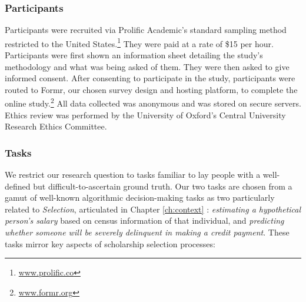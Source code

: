 \subsubsection{Participants}\label{ssec:participants}
Participants were recruited via Prolific Academic's standard sampling method restricted to the United States.\footnote{\url{www.prolific.co}} They were paid at a rate of \$15 per hour. Participants were first shown an information sheet detailing the study's methodology and what was being asked of them. They were then asked to give informed consent. After consenting to participate in the study, participants were routed to Formr, our chosen survey design and hosting platform, to complete the online study.\footnote{\url{www.formr.org}} All data collected was anonymous and was stored on secure servers. Ethics review was performed by the University of Oxford's Central University Research Ethics Committee.


\subsubsection{Tasks}\label{ssec:tasks}
We restrict our research question to tasks familiar to lay people with a well-defined but difficult-to-ascertain ground truth. Our two tasks are chosen from a gamut of well-known algorithmic decision-making tasks as two particularly related to \emph{Selection}, articulated in Chapter \ref{ch:context} \cite{10.1111/j.1467-954X.2007.00740.x,Pasquale_2006,Latzer_Hollnbuchner_Just_Saurwein_2014}: \emph{estimating a hypothetical person's salary} based on census information of that individual, and \emph{predicting whether someone will be severely delinquent in making a credit payment}. These tasks mirror key aspects of scholarship selection processes:

